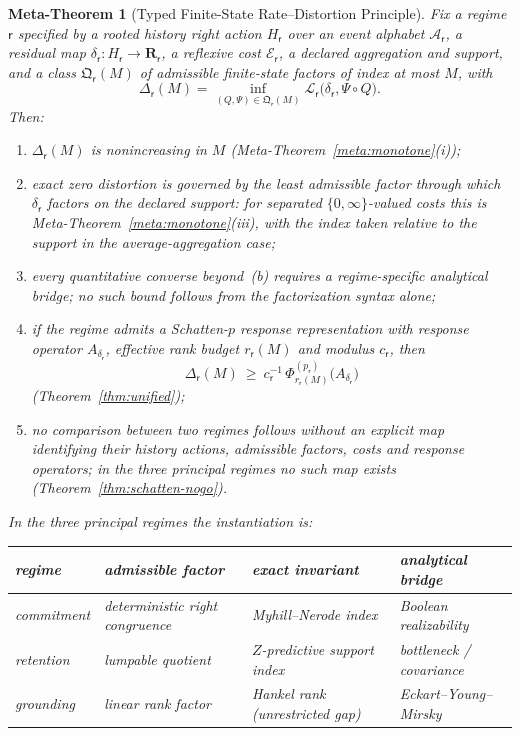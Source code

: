 \documentclass[12pt]{article}
\newtheorem{metatheorem}[theorem]{Meta-Theorem}
\theoremstyle{definition}
\begin{document}
\begin{metatheorem}[Typed Finite-State Rate--Distortion Principle]
\label{meta:typed-rate-distortion}
Fix a regime $\mathsf r$ specified by a rooted history right action
$H_{\mathsf r}$ over an event alphabet $\mathcal A_{\mathsf r}$, a residual map
$\delta_{\mathsf r}:H_{\mathsf r}\to\mathbf R_{\mathsf r}$, a reflexive cost
$\mathcal E_{\mathsf r}$, a declared aggregation and support, and a class
$\mathfrak Q_{\mathsf r}(M)$ of admissible finite-state factors of index at
most $M$, with
\[
\Delta_{\mathsf r}(M)
=
\inf_{(Q,\Psi)\in\mathfrak Q_{\mathsf r}(M)}
\mathcal L_{\mathsf r}\bigl(\delta_{\mathsf r},\Psi\circ Q\bigr).
\]
Then:
\begin{enumerate}[label=(\alph*)]
\item $\Delta_{\mathsf r}(M)$ is nonincreasing in $M$
(Meta-Theorem~\ref{meta:monotone}(i));
\item exact zero distortion is governed by the least admissible factor
through which $\delta_{\mathsf r}$ factors on the declared support: for
separated $\{0,\infty\}$-valued costs this is
Meta-Theorem~\ref{meta:monotone}(iii), with the index taken relative to the
support in the average-aggregation case;
\item every quantitative converse beyond~(b) requires a regime-specific
analytical bridge; no such bound follows from the factorization syntax alone;
\item if the regime admits a Schatten-$p$ response representation with
response operator $A_{\delta_{\mathsf r}}$, effective rank budget
$r_{\mathsf r}(M)$ and modulus $c_{\mathsf r}$, then
\[
\Delta_{\mathsf r}(M)
\ \ge\
c_{\mathsf r}^{-1}\,
\Phi^{(p_{\mathsf r})}_{r_{\mathsf r}(M)}\bigl(A_{\delta_{\mathsf r}}\bigr)
\]
(Theorem~\ref{thm:unified});
\item no comparison between two regimes follows without an explicit map
identifying their history actions, admissible factors, costs and response
operators; in the three principal regimes no such map exists
(Theorem~\ref{thm:schatten-nogo}).
\end{enumerate}

In the three principal regimes the instantiation is:

\begin{center}
\begin{tabular}{llll}
\toprule
regime & admissible factor & exact invariant & analytical bridge \\
\midrule
commitment &
deterministic right congruence &
Myhill--Nerode index &
Boolean realizability \\
retention &
lumpable quotient &
$Z$-predictive support index &
bottleneck / covariance \\
grounding &
linear rank factor &
Hankel rank (unrestricted gap) &
Eckart--Young--Mirsky \\
\bottomrule
\end{tabular}
\end{center}


\end{metatheorem}
\end{document}
